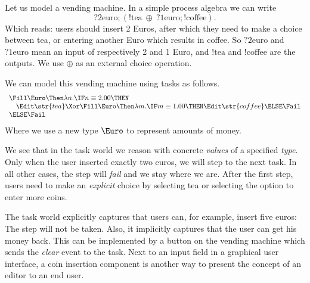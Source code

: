 Let us model a vending machine.
In a simple process algebra we can write
\begin{equation*}
  ?\text{2euro}; (!\text{tea}\ \oplus\ ?\text{1euro}; !\text{coffee}).
\end{equation*}
Which reads:
users should insert 2 Euros,
after which they need to make a choice between tea,
or entering another Euro which results in coffee.
So $?\text{2euro}$ and $?\text{1euro}$ mean an input of respectively 2 and 1 Euro,
and $!\text{tea}$ and $!\text{coffee}$ are the outputs.
We use $\oplus$ as an external choice operation.

We can model this vending machine using tasks as follows.
\begin{equation*}
  \begin{array}{l}
    \Fill \Euro \Then \lambda n.
    \IF n \equiv 2.00 \THEN \\
     \quad \Edit \str{tea}
      \Xor
        \Fill \Euro \Then \lambda m.
        \IF m \equiv 1.00 \THEN
          \Edit \str{coffee}
        \ELSE
          \Fail \\
    \ELSE \Fail
  \end{array}
\end{equation*}
Where we use a new type $\Euro$ to represent amounts of money.

We see that in the task world we reason with concrete \emph{values} of a specified \emph{type}.
Only when the user inserted exactly two euros,
we will step to the next task.
In all other cases,
the step will \emph{fail} and we stay where we are.
After the first step,
users need to make an \emph{explicit} choice by selecting tea or selecting the option to enter more coins.

The task world explicitly captures that users can, for example, insert five euros:
The step will not be taken.
Also, it implicitly captures that the user can get his money back.
This can be implemented by a button on the vending machine which sends the \emph{clear} event to the task.
Next to an input field in a graphical user interface,
a coin insertion component is another way to present the concept of an editor to an end user.



